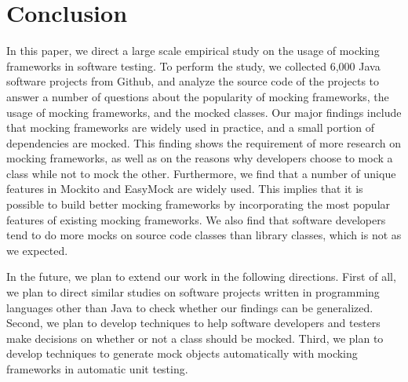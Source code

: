 \section{Conclusion}
\label{sec:conclude}
In this paper, we direct a large scale empirical study on the usage of mocking frameworks in software testing. To perform the study, we collected 6,000 Java software projects from Github, and analyze the source code of the projects to answer a number of questions about the popularity of mocking frameworks, the usage of mocking frameworks, and the mocked classes. 
Our major findings include that mocking frameworks are widely used in practice, and a small portion of dependencies are mocked. This finding shows the requirement of more research on mocking frameworks, as well as on the reasons why developers choose to mock a class while not to mock the other. Furthermore, we find that a number of unique features in Mockito and EasyMock are widely used. This implies that it is possible to build better mocking frameworks by incorporating the most popular features of existing mocking frameworks. We also find that software developers tend to do more mocks on source code classes than library classes, which is not as we expected. 

In the future, we plan to extend our work in the following directions. First of all, we plan to direct similar studies on software projects written in programming languages other than Java to check whether our findings can be generalized. Second, we plan to develop techniques to help software developers and testers make decisions on whether or not a class should be mocked. Third, we plan to develop techniques to generate mock objects automatically with mocking frameworks in automatic unit testing. 